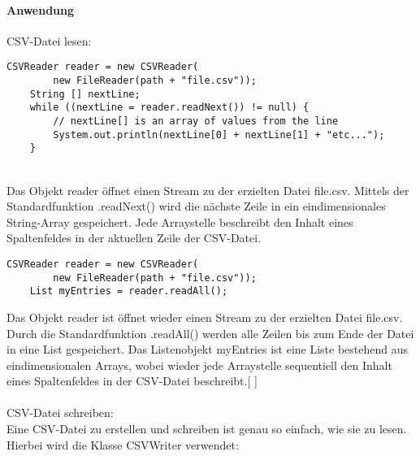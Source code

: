 \documentclass[FIPLY_base.tex]{subfiles}
\begin{document}
\paragraph{Anwendung}
CSV-Datei lesen:
\begin{lstlisting}[caption={Verwendung von CSVReader: Möglichkeit 1, iterativ},label=DescriptiveLabel]
	CSVReader reader = new CSVReader(
		new FileReader(path + "file.csv"));
	String [] nextLine;
	while ((nextLine = reader.readNext()) != null) {
		// nextLine[] is an array of values from the line
		System.out.println(nextLine[0] + nextLine[1] + "etc...");
	}

\end{lstlisting}
\ \\
Das Objekt \grqq{}reader\grqq{} öffnet einen Stream zu der erzielten Datei \grqq{}file.csv\grqq{}. Mittels der Standardfunktion .readNext() wird die nächste Zeile in ein eindimensionales String-Array gespeichert. Jede Arraystelle beschreibt den Inhalt eines Spaltenfeldes in der aktuellen Zeile der CSV-Datei.
\ \\
\begin{lstlisting}[caption={Verwendung von CSVReader: Möglichkeit 2, alles auf einmal},label=DescriptiveLabel]
	CSVReader reader = new CSVReader(
		new FileReader(path + "file.csv"));
	List myEntries = reader.readAll();
\end{lstlisting}
Das Objekt \grqq{}reader\grqq{} ist öffnet wieder einen Stream zu der erzielten Datei \grqq{}file.csv\grqq{}. Durch die Standardfunktion .readAll() werden alle Zeilen bis zum Ende der Datei in eine List gespeichert. Das Listenobjekt myEntries ist eine Liste bestehend aus eindimensionalen Arrays, wobei wieder jede Arraystelle sequentiell den Inhalt eines Spaltenfeldes in der CSV-Datei beschreibt.[ \cite{exportCSVSourceRead}] 
\ \\
\ \\
CSV-Datei schreiben:
\ \\
Eine CSV-Datei zu erstellen und schreiben ist genau so einfach, wie sie zu lesen. Hierbei wird die Klasse \grqq{}CSVWriter\grqq{} verwendet:
\end{document}
